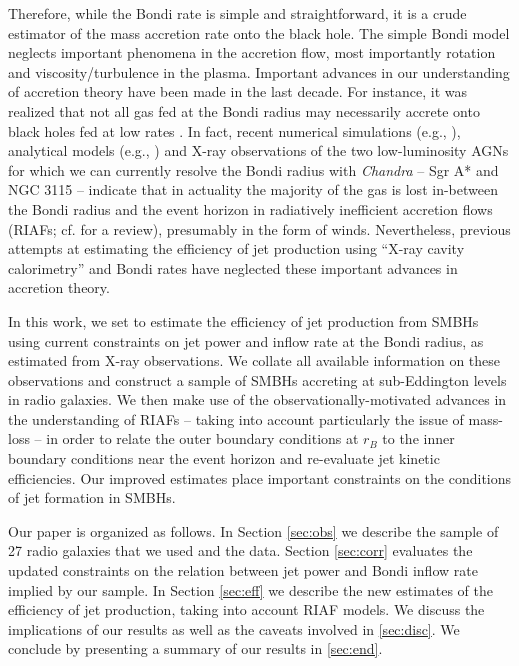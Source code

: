 \documentclass[useAMS,usenatbib]{mn2e}
\begin{document}
Therefore, while the Bondi rate is simple and straightforward, it is a crude estimator of the mass accretion rate onto the black hole. The simple Bondi model neglects important phenomena in the accretion flow, most importantly rotation and viscosity/turbulence in the plasma. Important advances in our understanding of accretion theory have been made in the last decade. For instance, it was realized that not all gas fed at the Bondi radius may necessarily accrete onto black holes fed at low rates \citep{Narayan94,Blandford99}. In fact, recent numerical simulations (e.g., \citealt{Yuan12,Yuan12b,Sadowski13sim,Li13}), analytical models (e.g., \citealt{Begelman12}) and X-ray observations of the two low-luminosity AGNs for which we can currently resolve the Bondi radius with \emph{Chandra} -- Sgr A* and NGC 3115 \citep{Wang13,Wong14} -- indicate that in actuality the majority of the gas is lost in-between the Bondi radius and the event horizon in radiatively inefficient accretion flows (RIAFs; cf.   \citealt{Yuan14} for a review), presumably in the form of winds. Nevertheless, previous attempts at estimating the efficiency of jet production using ``X-ray cavity calorimetry'' and Bondi rates have neglected these important advances in accretion theory.

In this work, we set to estimate the efficiency of jet production from SMBHs using current constraints on jet power and inflow rate at the Bondi radius, as estimated from X-ray observations. We collate all available information on these observations and construct a sample of SMBHs accreting at sub-Eddington levels in radio galaxies. We then make use of the observationally-motivated advances in the understanding of RIAFs -- taking into account particularly the issue of mass-loss -- in order to relate the outer boundary conditions at $r_B$ to the inner boundary conditions near the event horizon and re-evaluate jet kinetic efficiencies. Our improved estimates place important constraints on the conditions of jet formation in SMBHs. 

Our paper is organized as follows. In Section \ref{sec:obs} we describe the sample of 27 radio galaxies that we used and the data. Section \ref{sec:corr} evaluates the updated constraints on the relation between jet power and Bondi inflow rate implied by our sample. In Section \ref{sec:eff} we describe the new estimates of the efficiency of jet production, taking into account RIAF models. We discuss the implications of our results as well as the caveats involved in \textsection \ref{sec:disc}. We conclude by presenting a summary of our results in \textsection \ref{sec:end}. 
\end{document}

